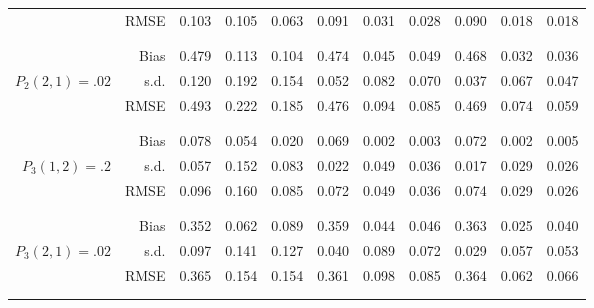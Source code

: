 \begin{tabular}{rr@{\hskip .3in}ccc@{\hskip .4in}ccc@{\hskip .4in}ccc}
&RMSE & 0.103&0.105&0.063&0.091&0.031&0.028&0.090&0.018&0.018 \\
\\\\&Bias & 0.479&0.113&0.104&0.474&0.045&0.049&0.468&0.032&0.036 \\
$ P_{2}(2,1)=.02 $& s.d. & 0.120&0.192&0.154&0.052&0.082&0.070&0.037&0.067&0.047 \\
&RMSE & 0.493&0.222&0.185&0.476&0.094&0.085&0.469&0.074&0.059 \\
\\\\&Bias & 0.078&0.054&0.020&0.069&0.002&0.003&0.072&0.002&0.005 \\
$ P_{3}(1,2)=.2 $& s.d. & 0.057&0.152&0.083&0.022&0.049&0.036&0.017&0.029&0.026 \\
&RMSE & 0.096&0.160&0.085&0.072&0.049&0.036&0.074&0.029&0.026 \\
\\\\&Bias & 0.352&0.062&0.089&0.359&0.044&0.046&0.363&0.025&0.040 \\
$ P_{3}(2,1)=.02 $& s.d. & 0.097&0.141&0.127&0.040&0.089&0.072&0.029&0.057&0.053 \\
&RMSE & 0.365&0.154&0.154&0.361&0.098&0.085&0.364&0.062&0.066 \\
\\\\\end{tabular}